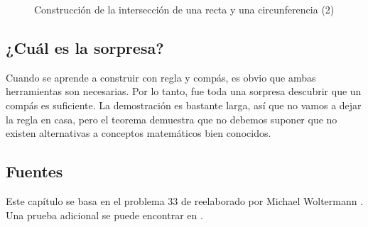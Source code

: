 \begin{figure}[b]
\begin{center}
\end{center}
\caption{Construcción de la intersección de una recta y una circunferencia (2)}\label{f.compass-circle5}
\end{figure}

\subsection*{¿Cuál es la sorpresa?}

Cuando se aprende a construir con regla y compás, es obvio que ambas herramientas son necesarias. Por lo tanto, fue toda una sorpresa descubrir que un compás es suficiente. La demostración es bastante larga, así que no vamos a dejar la regla en casa, pero el teorema demuestra que no debemos suponer que no existen alternativas a conceptos matemáticos bien conocidos.

\subsection*{Fuentes}

Este capítulo se basa en el problema $33$ de \cite{dorrie1} reelaborado por Michael Woltermann \cite{dorrie2}. Una prueba adicional se puede encontrar en \cite{mm}.
